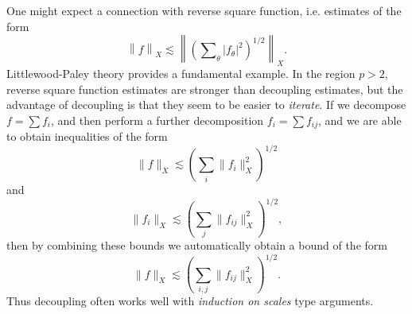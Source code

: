 One might expect a connection with reverse square function, i.e. estimates of the form
%
\[ \left\| f \right\|_X \lesssim \left\| \left( \sum\nolimits_\theta |f_\theta|^2 \right)^{1/2} \right\|_X. \]
%
Littlewood-Paley theory provides a fundamental example. In the region $p > 2$, reverse square function estimates are stronger than decoupling estimates, but the advantage of decoupling is that they seem to be easier to \emph{iterate}. If we decompose $f = \sum f_i$, and then perform a further decomposition $f_i = \sum f_{ij}$, and we are able to obtain inequalities of the form
%
\[ \| f \|_X \lesssim \left( \sum_i \| f_i \|_X^2 \right)^{1/2} \]
%
and
%
\[ \| f_i \|_X \lesssim \left( \sum_j \| f_{ij} \|_X^2 \right)^{1/2}, \]
%
then by combining these bounds we automatically obtain a bound of the form
%
\[ \| f \|_X \lesssim \left( \sum_{i,j} \| f_{ij} \|_X^2 \right)^{1/2}. \]
%
Thus decoupling often works well with \emph{induction on scales} type arguments.


%
%






%


%

